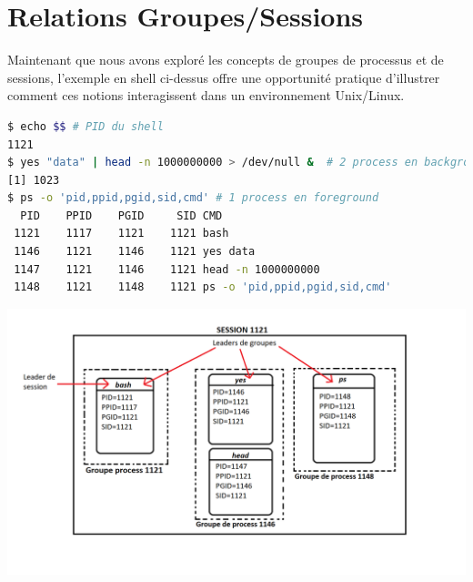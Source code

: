 \section{Relations Groupes/Sessions}

Maintenant que nous avons exploré les concepts de groupes de processus et de sessions, l'exemple en shell ci-dessus offre une opportunité pratique d'illustrer comment ces notions interagissent dans un environnement Unix/Linux.

\begin{lstlisting}[language=sh,basicstyle=\small]
$ echo $$ # PID du shell
1121
$ yes "data" | head -n 1000000000 > /dev/null &  # 2 process en background
[1] 1023
$ ps -o 'pid,ppid,pgid,sid,cmd' # 1 process en foreground
  PID    PPID    PGID     SID CMD
 1121    1117    1121    1121 bash
 1146    1121    1146    1121 yes data
 1147    1121    1146    1121 head -n 1000000000
 1148    1121    1148    1121 ps -o 'pid,ppid,pgid,sid,cmd'
\end{lstlisting}

\includegraphics[width=1\textwidth]{img/relationshipSchema.png}